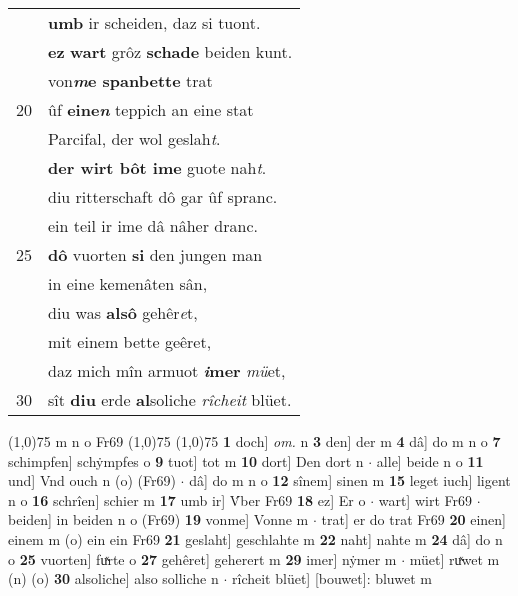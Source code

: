 \documentclass[8pt,a4paper,notitlepage]{article}
\begin{document}
\begin{table}[ht]
\begin{minipage}[t]{0.5\linewidth}
\begin{tabular}{rl}
 & \textbf{umb} ir scheiden, daz si tuont.\\ 
 & \textbf{ez} \textbf{wart} grôz \textbf{schade} beiden kunt.\\ 
 & von\textbf{\textit{m}e spanbette} trat\\ 
20 & ûf \textbf{eine\textit{n}} teppich an eine stat\\ 
 & Parcifal, der wol geslah\textit{t}.\\ 
 & \textbf{der wirt bôt ime} guote nah\textit{t}.\\ 
 & diu ritterschaft dô gar ûf spranc.\\ 
 & ein teil ir ime dâ nâher dranc.\\ 
25 & \textbf{dô} vuorten \textbf{si} den jungen man\\ 
 & in eine kemenâten sân,\\ 
 & diu was \textbf{alsô} gehêr\textit{e}t,\\ 
 & mit einem bette geêret,\\ 
 & daz mich mîn armuot \textbf{\textit{i}mer} \textit{mü}et,\\ 
30 & sît \textbf{diu} erde \textbf{al}soliche \textit{rîcheit} blüet.\\ 
\end{tabular}
\scriptsize
\line(1,0){75} \newline
m n o Fr69 \newline
\line(1,0){75} \newline
\newline
\line(1,0){75} \newline
\textbf{1} doch] \textit{om.} n \textbf{3} den] der m \textbf{4} dâ] do m n o \textbf{7} schimpfen] schẏmpfes o \textbf{9} tuot] tot m \textbf{10} dort] Den dort n  $\cdot$ alle] beide n o \textbf{11} und] Vnd ouch n (o) (Fr69)  $\cdot$ dâ] do m n o \textbf{12} sînem] sinen m \textbf{15} leget iuch] ligent n o \textbf{16} schrîen] schier m \textbf{17} umb ir] V́ber Fr69 \textbf{18} ez] Er o  $\cdot$ wart] wirt Fr69  $\cdot$ beiden] in beiden n o (Fr69) \textbf{19} vonme] Vonne m  $\cdot$ trat] er do trat Fr69 \textbf{20} einen] einem m (o) ein ein Fr69 \textbf{21} geslaht] geschlahte m \textbf{22} naht] nahte m \textbf{24} dâ] do n o \textbf{25} vuorten] fuͯrte o \textbf{27} gehêret] geherert m \textbf{29} imer] nẏmer m  $\cdot$ müet] ruͯwet m (n) (o) \textbf{30} alsoliche] also solliche n  $\cdot$ rîcheit blüet] [bouwet]: bluwet m \newline
\end{minipage}
\end{table}
\end{document}
